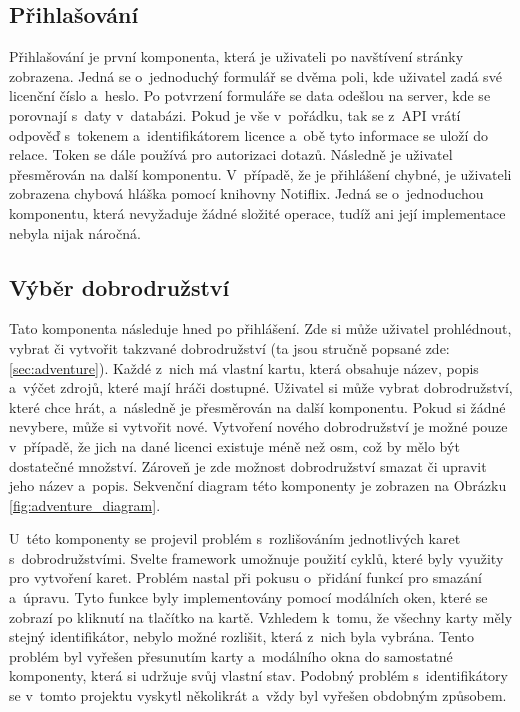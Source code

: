 \subsection{Přihlašování}
Přihlašování je první komponenta, která je uživateli po navštívení stránky zobrazena. Jedná se o~jednoduchý formulář se dvěma poli, kde uživatel zadá své licenční číslo a~heslo. Po potvrzení formuláře se data odešlou na server, kde se porovnají s~daty v~databázi. Pokud je vše v~pořádku, tak se z~API vrátí odpověď s~tokenem a~identifikátorem licence a~obě tyto informace se uloží do relace. Token se dále používá pro autorizaci dotazů. Následně je uživatel přesměrován na další komponentu. V~případě, že je přihlášení chybné, je uživateli zobrazena chybová hláška pomocí knihovny Notiflix. Jedná se o~jednoduchou komponentu, která nevyžaduje žádné složité operace, tudíž ani její implementace nebyla nijak náročná.

\subsection{Výběr dobrodružství}
Tato komponenta následuje hned po přihlášení. Zde si může uživatel prohlédnout, vybrat či vytvořit takzvané dobrodružství (ta jsou stručně popsané zde: \ref{sec:adventure}). Každé z~nich má vlastní kartu, která obsahuje název, popis a~výčet zdrojů, které mají hráči dostupné. Uživatel si může vybrat dobrodružství, které chce hrát, a~následně je přesměrován na další komponentu. Pokud si žádné nevybere, může si vytvořit nové. Vytvoření nového dobrodružství je možné pouze v~případě, že jich na dané licenci existuje méně než osm, což by mělo být dostatečné množství. Zároveň je zde možnost dobrodružství smazat či upravit jeho název a~popis. Sekvenční diagram této komponenty je zobrazen na Obrázku \ref{fig:adventure_diagram}.

U~této komponenty se projevil problém s~rozlišováním jednotlivých karet s~dobrodružstvími. Svelte framework umožnuje použití cyklů, které byly využity pro vytvoření karet. Problém nastal při pokusu o~přidání funkcí pro smazání a~úpravu. Tyto funkce byly implementovány pomocí modálních oken, které se zobrazí po kliknutí na tlačítko na kartě. Vzhledem k~tomu, že všechny karty měly stejný identifikátor, nebylo možné rozlišit, která z~nich byla vybrána. Tento problém byl vyřešen přesunutím karty a~modálního okna do samostatné komponenty, která si udržuje svůj vlastní stav. Podobný problém s~identifikátory se v~tomto projektu vyskytl několikrát a~vždy byl vyřešen obdobným způsobem.

